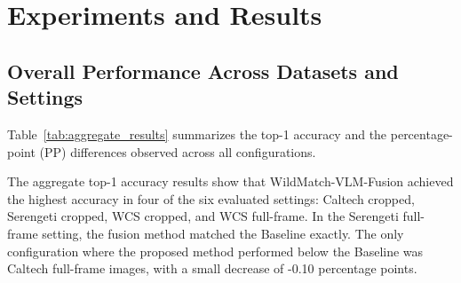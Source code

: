 \section{Experiments and Results}

\subsection{Overall Performance Across Datasets and Settings}
Table~\ref{tab:aggregate_results} summarizes the top-1 accuracy and the percentage-point (PP) differences observed across all configurations.

\begin{table}[!ht]
\centering
\caption{Top-1 accuracy across datasets and image settings. The PP column reports the percentage-point difference between WildMatch-VLM-Fusion and the baseline.}
\label{tab:aggregate_results}

\end{table}

The aggregate top-1 accuracy results show that WildMatch-VLM-Fusion achieved the highest accuracy in four of the six evaluated settings: Caltech cropped, Serengeti cropped, WCS cropped, and WCS full-frame. In the Serengeti full-frame setting, the fusion method matched the Baseline exactly. The only configuration where the proposed method performed below the Baseline was Caltech full-frame images, with a small decrease of -0.10 percentage points.


